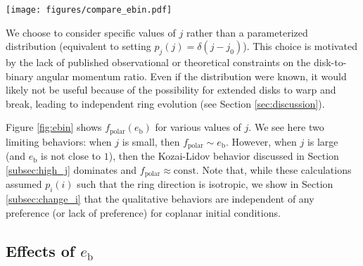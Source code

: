 \documentclass[twocolumn,linenumbers]{aastex631}
\begin{document}
\begin{figure*}[!htbp]
    \begin{centering}
        \texttt{[image: figures/compare\_ebin.pdf]}
        \caption{
            Polar fraction as a function of $e_{\rm b}$ for various values of $j$. Each line is computed via a numerical integration of equation (\ref{eq:prob_polar}), assuming an isotropic distribution of $i$.
            In the low-$j$ regime the polar fraction is a strong function of $e_{\rm b}$. However, as $j$ increases, $f_{\rm polar}$ becomes insensitive to the binary eccentricity (except for the case that $e_\text{b}\approx 1$). Note that $f_\text{polar}(e_\text{b}\approx 0)$ is maximized when $j=0.5$.
        }
        \label{fig:ebin}
    \end{centering}
\end{figure*}

We choose to consider specific values of $j$ rather than a parameterized distribution (equivalent to setting $p_j(j) = \delta(j-j_0)$). This choice is motivated by the lack of published observational or theoretical constraints on the disk-to-binary angular momentum ratio. Even if the distribution were known, it would likely not be useful because of the possibility for extended disks to warp and break, leading to independent ring evolution (see Section \ref{sec:discussion}).

Figure \ref{fig:ebin} shows $f_\text{polar}(e_\text{b})$ for various values of $j$. We see here two limiting behaviors: when $j$ is small, then $f_\text{polar}\sim e_\text{b}$. However, when $j$ is large (and $e_\text{b}$ is not close to $1$), then the Kozai-Lidov behavior discussed in Section \ref{subsec:high_j} dominates and $f_\text{polar}\approx \text{const}$. Note that, while these calculations assumed $p_i(i)$ such that the ring direction is isotropic, we show in Section \ref{subsec:change_i} that the qualitative behaviors are independent of any preference (or lack of preference) for coplanar initial conditions.

\subsection{Effects of $e_\text{b}$}
\label{subsec:effect-eb}
\end{document}
